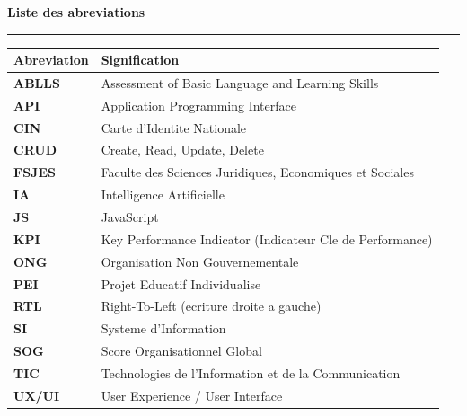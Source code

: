 \documentclass[12pt,a4paper,openany]{report}
\begin{document}
\cleardoublepage
\thispagestyle{empty}
\begin{center}
{\large\bfseries\color{bleu} Liste des abreviations}\\[0.2cm]
\textcolor{bleu}{\rule{0.5\textwidth}{0.5pt}}
\end{center}
\vspace{0.4cm}

\begin{longtable}{@{}>{\bfseries}p{3.5cm}p{11cm}@{}}
\toprule
\textbf{Abreviation} & \textbf{Signification}\\
\midrule
ABLLS & Assessment of Basic Language and Learning Skills\\
API   & Application Programming Interface\\
CIN   & Carte d'Identite Nationale\\
CRUD  & Create, Read, Update, Delete\\
FSJES & Faculte des Sciences Juridiques, Economiques et Sociales\\
IA    & Intelligence Artificielle\\
JS    & JavaScript\\
KPI   & Key Performance Indicator (Indicateur Cle de Performance)\\
ONG   & Organisation Non Gouvernementale\\
PEI   & Projet Educatif Individualise\\
RTL   & Right-To-Left (ecriture droite a gauche)\\
SI    & Systeme d'Information\\
SOG   & Score Organisationnel Global\\
TIC   & Technologies de l'Information et de la Communication\\
UX/UI & User Experience / User Interface\\
\bottomrule
\end{longtable}

\cleardoublepage
{}
\setcounter{page}{1}
\tableofcontents

\cleardoublepage
\listoffigures
{}

\cleardoublepage
\listoftables
{}
\end{document}
